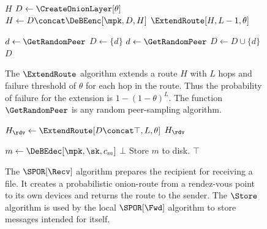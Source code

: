 
\begin{figure}
  \begin{algorithmic}
        \State \Return $H$
      \EndIf
      \State $D\gets \CreateOnionLayer[\theta]$
      \State $H\gets D\concat \DeBEenc[\mpk, D, H]$
      \State \Return $\ExtendRoute[H, L-1, \theta]$
    \EndFunction

    \Function{\CreateOnionLayer}{$\theta$}
      \State $d\gets \GetRandomPeer$
      \State $D\gets \{d\}$
        \State $d\gets \GetRandomPeer$
        \State $D\gets D\cup \{d\}$
      \EndWhile
      \State \Return $D$
    \EndFunction
  \end{algorithmic}
  \caption{\label{ExtendRoute}%
    The \(\ExtendRoute\) algorithm extends a route \(H\) with \(L\) hops and 
    failure threshold of \(\theta\) for each hop in the route.
    Thus the probability of failure for the extension is \(1 - (1 - \theta)^L\).
    The function \(\GetRandomPeer\) is any random peer-sampling algorithm.
  }
\end{figure}


\begin{figure}
  \begin{algorithmic}
      \State $H_\rdv\gets \ExtendRoute[D\concat \top, L, \theta]$
      \State \Return $H_\rdv$
    \EndFunction

      \State $m\gets \DeBEdec[\mpk, \sk, c_m]$
        \State \Return $\bot$
      \EndIf
      \State Store $m$ to disk.
      \State \Return $\top$
    \EndFunction
  \end{algorithmic}
  \caption{\label{SPORRecv}%
    The \(\SPOR[\Recv]\) algorithm prepares the recipient for receiving a file.
    It creates a probabilistic onion-route from a rendez-vous point to its own 
    devices and returns the route to the sender.
    The \(\Store\) algorithm is used by the local \(\SPOR[\Fwd]\) algorithm to 
    store messages intended for itself.
  }
\end{figure}

